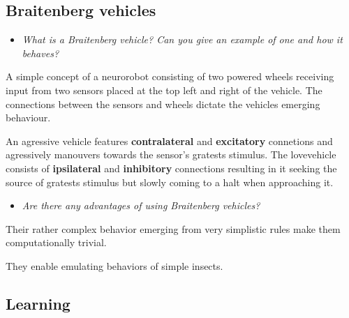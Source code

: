 \documentclass[
    fontsize      = 11pt,
    paper         = a4,
    twoside       = false,
    parskip       = half,
    pagesize      = false,
]{scrartcl}
\providecommand{\tightlist}{%
  \setlength{\itemsep}{0pt}\setlength{\parskip}{0pt}}
\begin{document}
\hypertarget{braitenberg-vehicles}{%
\subsection{Braitenberg vehicles}\label{braitenberg-vehicles}}

\begin{itemize}
\tightlist
\item
  \emph{What is a Braitenberg vehicle? Can you give an example of one
  and how it behaves?}
\end{itemize}

A simple concept of a neurorobot consisting of two powered wheels
receiving input from two sensors placed at the top left and right of the
vehicle. The connections between the sensors and wheels dictate the
vehicles emerging behaviour.

An agressive vehicle features \textbf{contralateral} and
\textbf{excitatory} connetions and agressively manouvers towards the
sensor's gratests stimulus. The \glqq love\grqq vehicle consists of
\textbf{ipsilateral} and \textbf{inhibitory} connections resulting in it
seeking the source of gratests stimulus but slowly coming to a halt when
approaching it.

\begin{itemize}
\tightlist
\item
  \emph{Are there any advantages of using Braitenberg vehicles?}
\end{itemize}

Their rather complex behavior emerging from very simplistic rules make
them computationally trivial.

They enable emulating behaviors of simple insects.

\hypertarget{learning}{%
\subsection{Learning}\label{learning}}
\end{document}
